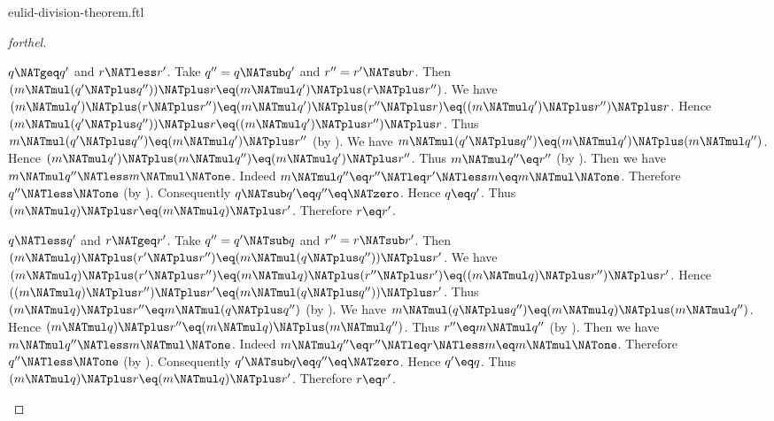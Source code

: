 \documentclass{naproche-library}
\begin{document}
\begin{smodule}[title=Euclid's Division Theorem]{eulid-division-theorem.ftl}
\begin{proof}[forthel]
  \begin{case}{$q \NATgeq q'$ and $r \NATless r'$.}
    Take $q'' = q \NATsub q'$ and $r'' = r' \NATsub r$.
    Then $(m \NATmul (q' \NATplus q'')) \NATplus r \eq (m \NATmul q') \NATplus (r \NATplus r'')$.
    We have $(m \NATmul q') \NATplus (r \NATplus r'')
      \eq (m \NATmul q') \NATplus (r'' \NATplus r)
      \eq ((m \NATmul q') \NATplus r'') \NATplus r$.
    Hence $(m \NATmul (q' \NATplus q'')) \NATplus r \eq ((m \NATmul q') \NATplus r'') \NATplus r$.
    Thus $m \NATmul (q' \NATplus q'') \eq (m \NATmul q') \NATplus r''$ (by ).
    We have $m \NATmul (q' \NATplus q'') \eq (m \NATmul q') \NATplus (m \NATmul q'')$.
    Hence $(m \NATmul q') \NATplus (m \NATmul q'') \eq (m \NATmul q') \NATplus r''$.
    Thus $m \NATmul q'' \eq r''$ (by ).
    Then we have $m \NATmul q'' \NATless m \NATmul \NATone$.
    Indeed $m \NATmul q''
      \eq r''
      \NATleq r'
      \NATless m
      \eq m \NATmul \NATone$.
    Therefore $q'' \NATless \NATone$ (by ).
    Consequently $q \NATsub q' \eq q'' \eq \NATzero$.
    Hence $q \eq q'$.
    Thus $(m \NATmul q) \NATplus r \eq (m \NATmul q) \NATplus r'$.
    Therefore $r \eq r'$.
  \end{case}

  \begin{case}{$q \NATless q'$ and $r \NATgeq r'$.}
    Take $q'' = q' \NATsub q$ and $r'' = r \NATsub r'$.
    Then $(m \NATmul q) \NATplus (r' \NATplus r'') \eq (m \NATmul (q \NATplus q'')) \NATplus r'$.
    We have $(m \NATmul q) \NATplus (r' \NATplus r'')
      \eq (m \NATmul q) \NATplus (r'' \NATplus r')
      \eq ((m \NATmul q) \NATplus r'') \NATplus r'$.
    Hence $((m \NATmul q) \NATplus r'') \NATplus r' \eq (m \NATmul (q \NATplus q'')) \NATplus r'$.
    Thus $(m \NATmul q) \NATplus r'' \eq m \NATmul (q \NATplus q'')$ (by ).
    We have $m \NATmul (q \NATplus q'') \eq (m \NATmul q) \NATplus (m \NATmul q'')$.
    Hence $(m \NATmul q) \NATplus r'' \eq (m \NATmul q) \NATplus (m \NATmul q'')$.
    Thus $r'' \eq m \NATmul q''$ (by ).
    Then we have $m \NATmul q'' \NATless m \NATmul \NATone$.
    Indeed $m \NATmul q''
      \eq r''
      \NATleq r
      \NATless m
      \eq m \NATmul \NATone$.
    Therefore $q'' \NATless \NATone$ (by ).
    Consequently $q' \NATsub q \eq q'' \eq \NATzero$.
    Hence $q' \eq q$.
    Thus $(m \NATmul q) \NATplus r \eq (m \NATmul q) \NATplus r'$.
    Therefore $r \eq r'$.
  \end{case}


\end{proof}
\end{smodule}
\end{document}
